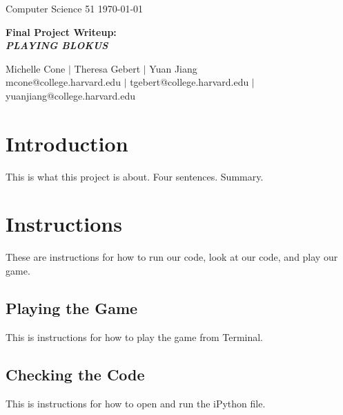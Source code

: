 \documentclass[11pt]{article}
\begin{document}
\doublespacing

\noindent Computer Science 51 \hfill \today\\
\noindent\makebox[\linewidth]{\rule{6.5in}{2.0pt}}

\begin{center}

{{\LARGE \bf Final Project Writeup:}} \\
\vspace{3mm}
{{\LARGE \bf \it PLAYING BLOKUS}}

\noindent\makebox[\linewidth]{\rule{6.5in}{2.0pt}}

\vspace{3mm}

{\large Michelle Cone $|$ Theresa Gebert $|$ Yuan Jiang \\
\normalsize mcone@college.harvard.edu $|$ tgebert@college.harvard.edu $|$ yuanjiang@college.harvard.edu} \\

\end{center}


\vspace{2mm}

\section{Introduction}

This is what this project is about. Four sentences. Summary.


\bigskip


\section{Instructions}

These are instructions for how to run our code, look at our code, and play our game.

\subsection{Playing the Game}

This is instructions for how to play the game from Terminal.

\subsection{Checking the Code}

This is instructions for how to open and run the iPython file.
\end{document}
